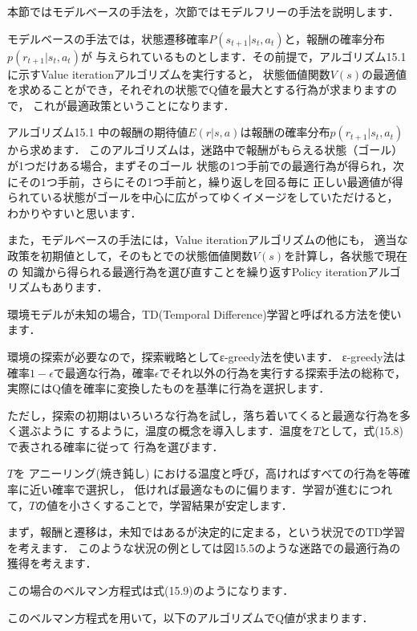 本節ではモデルベースの手法を，次節ではモデルフリーの手法を説明します．

モデルベースの手法では，状態遷移確率$P(s_{t+1}|s_t, a_t)$と，報酬の確率分布$p(r_{t+1}|s_t, a_t)$が
与えられているものとします．その前提で，アルゴリズム15.1に示すValue iterationアルゴリズムを実行すると，
状態価値関数$V(s)$の最適値を求めることができ，それぞれの状態でQ値を最大とする行為が求まりますので，
これが最適政策ということになります．

アルゴリズム15.1 中の報酬の期待値$E(r|s,a)$は報酬の確率分布$p(r_{t+1}|s_t, a_t)$から求めます．
このアルゴリズムは，迷路中で報酬がもらえる状態（ゴール）が1つだけある場合，まずそのゴール
状態の1つ手前での最適行為が得られ，次にその1つ手前，さらにその1つ手前と，繰り返しを回る毎に
正しい最適値が得られている状態がゴールを中心に広がってゆくイメージをしていただけると，
わかりやすいと思います．

また，モデルベースの手法には，Value iterationアルゴリズムの他にも，
適当な政策を初期値として，そのもとでの状態価値関数$V(s)$を計算し，各状態で現在の
知識から得られる最適行為を選び直すことを繰り返すPolicy iterationアルゴリズムもあります．


環境モデルが未知の場合，TD(Temporal Difference)学習と呼ばれる方法を使います．

環境の探索が必要なので，探索戦略としてε-greedy法を使います．
ε-greedy法は確率$1-\epsilon$で最適な行為，確率$\epsilon$でそれ以外の行為を実行する探索手法の総称で，
実際にはQ値を確率に変換したものを基準に行為を選択します．

ただし，探索の初期はいろいろな行為を試し，落ち着いてくると最適な行為を多く選ぶように
するように，温度の概念を導入します．温度を$T$として，式(15.8)で表される確率に従って
行為を選びます．

$T$を
アニーリング(焼き鈍し)
における温度と呼び，高ければすべての行為を等確率に近い確率で選択し，
低ければ最適なものに偏ります．学習が進むにつれて，$T$の値を小さくすることで，学習結果が安定します．


まず，報酬と遷移は，未知ではあるが決定的に定まる，という状況でのTD学習を考えます．
このような状況の例としては図15.5のような迷路での最適行為の獲得を考えます．

この場合のベルマン方程式は式(15.9)のようになります．


このベルマン方程式を用いて，以下のアルゴリズムでQ値が求まります．


